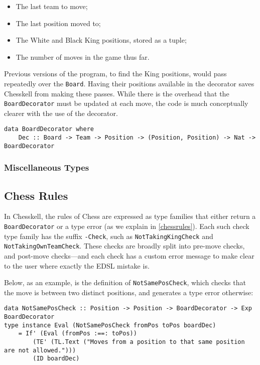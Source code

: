 \documentclass[12pt, a4paper, bibliography=totocnumbered]{scrreprt}
\newcommand{\inline}[1]{\lstinline[basicstyle=\ttfamily\footnotesize]{#1}}
\begin{document}
\begin{itemize}
    \item The last team to move;
    \item The last position moved to;
    \item The White and Black King positions, stored as a tuple;
    \item The number of moves in the game thus far.
\end{itemize}

Previous versions of the program, to find the King positions, would pass repeatedly over the \inline{Board}. Having their positions available in the decorator saves Chesskell from making these passes. While there is the overhead that the \inline{BoardDecorator} must be updated at each move, the code is much conceptually clearer with the use of the decorator.

\begin{lstlisting}
data BoardDecorator where
    Dec :: Board -> Team -> Position -> (Position, Position) -> Nat -> BoardDecorator
\end{lstlisting}

\subsubsection{Miscellaneous Types}

\subsection{Chess Rules}

In Chesskell, the rules of Chess are expressed as type families that either return a \inline{BoardDecorator} or a type error (as we explain in \cref{chessrules}). Each such check type family has the suffix \inline{-Check}, such as \inline{NotTakingKingCheck} and \inline{NotTakingOwnTeamCheck}. These checks are broadly split into pre-move checks, and post-move checks---and each check has a custom error message to make clear to the user where exactly the EDSL mistake is.

Below, as an example, is the definition of \inline{NotSamePosCheck}, which checks that the move is between two distinct positions, and generates a type error otherwise:

\begin{lstlisting}
data NotSamePosCheck :: Position -> Position -> BoardDecorator -> Exp BoardDecorator
type instance Eval (NotSamePosCheck fromPos toPos boardDec)
    = If' (Eval (fromPos :==: toPos))
        (TE' (TL.Text ("Moves from a position to that same position are not allowed.")))
        (ID boardDec)
\end{lstlisting}
\end{document}
